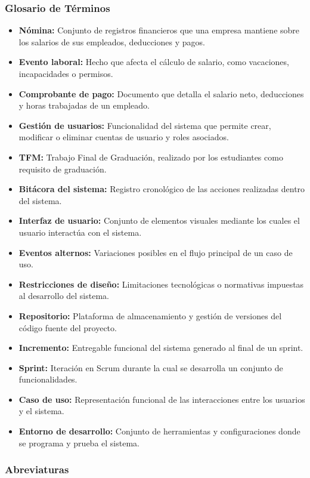 \documentclass[12pt, a4paper, oneside]{book}
\begin{document}
\subsubsection{Glosario de Términos}

\begin{itemize}
	\item \textbf{Nómina:} Conjunto de registros financieros que una empresa mantiene sobre los salarios de sus empleados, deducciones y pagos.
	\item \textbf{Evento laboral:} Hecho que afecta el cálculo de salario, como vacaciones, incapacidades o permisos.
	\item \textbf{Comprobante de pago:} Documento que detalla el salario neto, deducciones y horas trabajadas de un empleado.
	\item \textbf{Gestión de usuarios:} Funcionalidad del sistema que permite crear, modificar o eliminar cuentas de usuario y roles asociados.
	\item \textbf{TFM:} Trabajo Final de Graduación, realizado por los estudiantes como requisito de graduación.
	\item \textbf{Bitácora del sistema:} Registro cronológico de las acciones realizadas dentro del sistema.
	\item \textbf{Interfaz de usuario:} Conjunto de elementos visuales mediante los cuales el usuario interactúa con el sistema.
	\item \textbf{Eventos alternos:} Variaciones posibles en el flujo principal de un caso de uso.
	\item \textbf{Restricciones de diseño:} Limitaciones tecnológicas o normativas impuestas al desarrollo del sistema.
	\item \textbf{Repositorio:} Plataforma de almacenamiento y gestión de versiones del código fuente del proyecto.
	\item \textbf{Incremento:} Entregable funcional del sistema generado al final de un sprint.
	\item \textbf{Sprint:} Iteración en Scrum durante la cual se desarrolla un conjunto de funcionalidades.
	\item \textbf{Caso de uso:} Representación funcional de las interacciones entre los usuarios y el sistema.
	\item \textbf{Entorno de desarrollo:} Conjunto de herramientas y configuraciones donde se programa y prueba el sistema.
\end{itemize}

\subsubsection{Abreviaturas}
\end{document}

